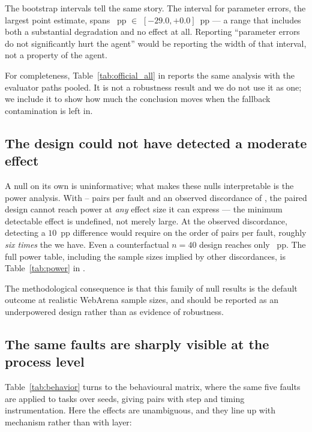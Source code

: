 The bootstrap intervals tell the same story. The interval for parameter errors,
the largest point estimate, spans
\ResAgentParamErrorDeltaNat{}~pp $\in$ $[-29.0, +0.0]$~pp --- a range that
includes both a substantial degradation and no effect at all. Reporting
``parameter errors do not significantly hurt the agent'' would be reporting the
width of that interval, not a property of the agent.



For completeness, Table~\ref{tab:official_all} in  reports the
same analysis with the evaluator paths pooled. It is not a robustness result and
we do not use it as one; we include it to show how much the conclusion moves when
the fallback contamination is left in.

\subsection{The design could not have detected a moderate effect}
\label{sec:res-power}

A null on its own is uninformative; what makes these nulls interpretable is the
power analysis. With \ResWebDomMissingNNat--\ResWebTimeoutNNat{} pairs per fault
and an observed discordance of \PiDNative{}, the paired design cannot reach
\Power{} power at \emph{any} effect size it can express --- the minimum detectable
effect is undefined, not merely large. At the observed discordance, detecting a
$10$~pp difference would require on the order of \PairsForTenPPObserved{} pairs
per fault, roughly \emph{six times} the \ResWebTimeoutNNat{} we have. Even a
counterfactual $n=40$ design reaches only \MdePairedNForty{}~pp. The full
power table, including the sample sizes implied by other discordances, is
Table~\ref{tab:power} in .

The methodological consequence is that this family of null results is the default
outcome at realistic WebArena sample sizes, and should be reported as an
underpowered design rather than as evidence of robustness.

\subsection{The same faults are sharply visible at the process level}
\label{sec:res-behavior}

Table~\ref{tab:behavior} turns to the behavioural matrix, where the same five
faults are applied to \MatrixTasks{} tasks over \TrialsPerCell{} seeds, giving
\MatrixPairs{} pairs with step and timing instrumentation. Here the effects are
unambiguous, and they line up with mechanism rather than with layer:

